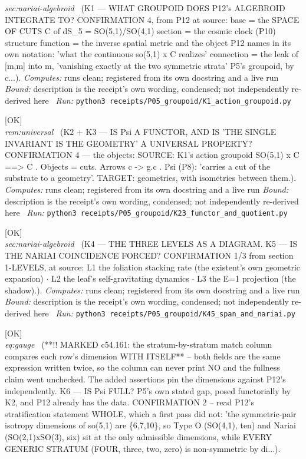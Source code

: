 \begin{description}
\textit{sec:nariai-algebroid} \ (K1 --- WHAT GROUPOID DOES P12's ALGEBROID INTEGRATE TO? CONFIRMATION 4, from P12 at source: base = the SPACE OF CUTS C of dS\_5 = SO(5,1)/SO(4,1) section = the cosmic clock (P10) structure function = the inverse spatial metric and the object P12 names in its own notation: 'what the continuous so(5,1) \textbar{}x C realizes' connection = the leak of [m,m] into m, 'vanishing exactly at the two symmetric strata' P5's groupoid, by c...). 
\emph{Computes:} runs clean; registered from its own docstring and a live run
 \emph{Bound:} description is the receipt's own wording, condensed; not independently re-derived here
\ \emph{Run:} \texttt{python3 receipts/P05\_groupoid/K1\_action\_groupoid.py}
\item[\label{rcpt:K23_functor_and_quotient}\texttt{K23\_functor\_and\_quotient}]\hfill\textsf{[OK]}\\
\textit{rem:universal} \ (K2 + K3 --- IS Psi A FUNCTOR, AND IS 'THE SINGLE INVARIANT IS THE GEOMETRY' A UNIVERSAL PROPERTY? CONFIRMATION 4 --- the objects: SOURCE: K1's action groupoid SO(5,1) \textbar{}x C ==> C . Objects = cuts. Arrows c -> g.c . Psi (P8): 'carries a cut of the substrate to a geometry'. TARGET: geometries, with isometries between them.). 
\emph{Computes:} runs clean; registered from its own docstring and a live run
 \emph{Bound:} description is the receipt's own wording, condensed; not independently re-derived here
\ \emph{Run:} \texttt{python3 receipts/P05\_groupoid/K23\_functor\_and\_quotient.py}
\item[\label{rcpt:K45_span_and_nariai}\texttt{K45\_span\_and\_nariai}]\hfill\textsf{[OK]}\\
\textit{sec:nariai-algebroid} \ (K4 --- THE THREE LEVELS AS A DIAGRAM. K5 --- IS THE NARIAI COINCIDENCE FORCED? CONFIRMATION 1/3 from section 1-LEVELS, at source: L1 the foliation stacking rate (the existent's own geometric expansion) \ensuremath{\cdot} L2 the leaf's self-gravitating dynamics \ensuremath{\cdot} L3 the E=1 projection (the shadow).). 
\emph{Computes:} runs clean; registered from its own docstring and a live run
 \emph{Bound:} description is the receipt's own wording, condensed; not independently re-derived here
\ \emph{Run:} \texttt{python3 receipts/P05\_groupoid/K45\_span\_and\_nariai.py}
\item[\label{rcpt:K6_fullness}\texttt{K6\_fullness}]\hfill\textsf{[OK]}\\
\textit{eq:gauge} \ (**!! MARKED c54.161: the stratum-by-stratum match column compares each row's dimension WITH ITSELF** -- both fields are the same expression written twice, so the column can never print NO and the fullness claim went unchecked. The added assertions pin the dimensions against P12's independently. K6 --- IS Psi FULL? P5's own stated gap, posed functorially by K2, and P12 already has the data. CONFIRMATION 2 -- read P12's stratification statement WHOLE, which a first pass did not: 'the symmetric-pair isotropy dimensions of so(5,1) are \{6,7,10\}, so Type O (SO(4,1), ten) and Nariai (SO(2,1)xSO(3), six) sit at the only admissible dimensions, while EVERY GENERIC STRATUM (FOUR, three, two, zero) is non-symmetric by di...). 

\end{description}
